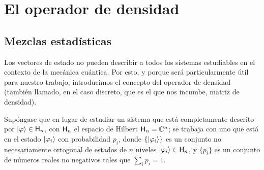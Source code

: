 \section{El operador de densidad}

\subsection{Mezclas estadísticas}

Los vectores de estado no pueden describir a todos los sistemas estudiables en el contexto de la mecánica cuántica. Por esto, y porque será particularmente útil para nuestro trabajo, introducimos el concepto del operador de densidad (también llamado, en el caso discreto, que es el que nos incumbe, matriz de densidad).

Supóngase que en lugar de estudiar un sistema que está completamente descrito por $\ket{\varphi}\in{\sf H}_{n}$, con ${\sf H}_{n}$ el espacio de Hilbert ${\sf H}_{n}=\mathbb{C}^{n}$; se trabaja con uno que está en el estado $\ket{\varphi_{i}}$ con probabilidad $p_{i}$, donde $\{\ket{\varphi_{i}}\}$ es un conjunto no necesariamente ortogonal de estados de $n$ niveles $\ket{\varphi_{i}}\in{\sf H}_{n}$, y $\{p_{i}\}$ es un conjunto de números reales no negativos tales que $\sum_{i}p_{i}=1$.

